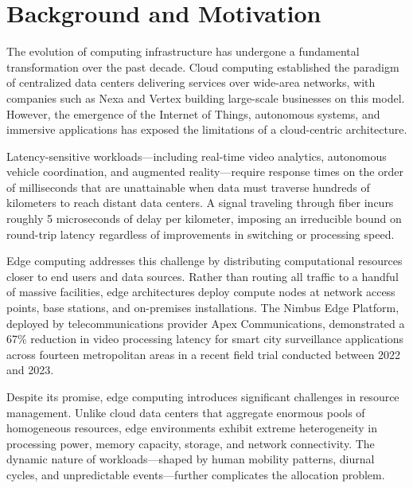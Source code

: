 \section{Background and Motivation}

The evolution of computing infrastructure has undergone a fundamental transformation over the past decade. Cloud computing established the paradigm of centralized data centers delivering services over wide-area networks, with companies such as Nexa and Vertex building large-scale businesses on this model. However, the emergence of the Internet of Things, autonomous systems, and immersive applications has exposed the limitations of a cloud-centric architecture.

Latency-sensitive workloads---including real-time video analytics, autonomous vehicle coordination, and augmented reality---require response times on the order of milliseconds that are unattainable when data must traverse hundreds of kilometers to reach distant data centers. A signal traveling through fiber incurs roughly 5 microseconds of delay per kilometer, imposing an irreducible bound on round-trip latency regardless of improvements in switching or processing speed.

Edge computing addresses this challenge by distributing computational resources closer to end users and data sources. Rather than routing all traffic to a handful of massive facilities, edge architectures deploy compute nodes at network access points, base stations, and on-premises installations. The Nimbus Edge Platform, deployed by telecommunications provider Apex Communications, demonstrated a 67\% reduction in video processing latency for smart city surveillance applications across fourteen metropolitan areas in a recent field trial conducted between 2022 and 2023.

Despite its promise, edge computing introduces significant challenges in resource management. Unlike cloud data centers that aggregate enormous pools of homogeneous resources, edge environments exhibit extreme heterogeneity in processing power, memory capacity, storage, and network connectivity. The dynamic nature of workloads---shaped by human mobility patterns, diurnal cycles, and unpredictable events---further complicates the allocation problem.
